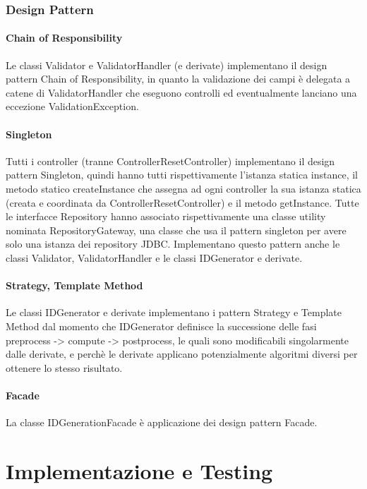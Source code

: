 \documentclass[a4paper,12pt]{report}
\begin{document}
		
		\subsection{Design Pattern}
			\subsubsection{Chain of Responsibility}
			Le classi Validator e ValidatorHandler (e derivate) implementano il design pattern Chain of Responsibility, in quanto la validazione dei campi è delegata a catene di ValidatorHandler che eseguono controlli ed eventualmente lanciano una eccezione ValidationException.
		
			\subsubsection{Singleton}	
			Tutti i controller (tranne ControllerResetController) implementano il design pattern Singleton, quindi hanno tutti rispettivamente l'istanza statica instance, il metodo statico createInstance che assegna ad ogni controller la sua istanza statica (creata e coordinata da ControllerResetController) e il metodo getInstance.
Tutte le interfacce Repository hanno associato rispettivamente una classe utility nominata RepositoryGateway, una classe che usa il pattern singleton per avere solo una istanza dei repository JDBC.
Implementano questo pattern anche le classi Validator, ValidatorHandler e le classi IDGenerator e derivate. 
				
		\subsubsection{Strategy, Template Method}
		Le classi IDGenerator e derivate implementano i pattern Strategy e Template Method dal momento che IDGenerator definisce la successione delle fasi preprocess -> compute -> postprocess, le quali sono modificabili singolarmente dalle derivate, e perchè le derivate applicano potenzialmente algoritmi diversi per ottenere lo stesso risultato. 
		
		\subsubsection{Facade}		
		La classe IDGenerationFacade è applicazione dei design pattern Facade.

      \chapter{Implementazione e Testing}
      
\end{document}
